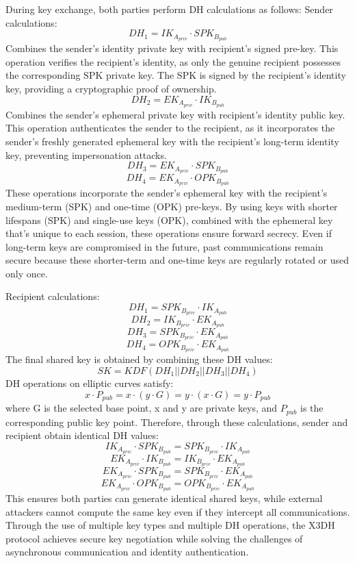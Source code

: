 \documentclass[9pt,a4paper,twoside]{rho-class/rho}
\begin{document}
During key exchange, both parties perform DH calculations as follows:
Sender calculations:
$$DH_1 = IK_{A_{priv}} \cdot SPK_{B_{pub}}$$
Combines the sender's identity private key with recipient's signed pre-key. This operation verifies the recipient's identity, as only the genuine recipient possesses the corresponding SPK private key. The SPK is signed by the recipient's identity key, providing a cryptographic proof of ownership.
$$DH_2 = EK_{A_{priv}} \cdot IK_{B_{pub}}$$
Combines the sender's ephemeral private key with recipient's identity public key. This operation authenticates the sender to the recipient, as it incorporates the sender's freshly generated ephemeral key with the recipient's long-term identity key, preventing impersonation attacks.
$$DH_3 = EK_{A_{priv}} \cdot SPK_{B_{pub}}$$
$$DH_4 = EK_{A_{priv}} \cdot OPK_{B_{pub}}$$
These operations incorporate the sender's ephemeral key with the recipient's medium-term (SPK) and one-time (OPK) pre-keys. By using keys with shorter lifespans (SPK) and single-use keys (OPK), combined with the ephemeral key that's unique to each session, these operations ensure forward secrecy. Even if long-term keys are compromised in the future, past communications remain secure because these shorter-term and one-time keys are regularly rotated or used only once.

Recipient calculations:
$$DH_1 = SPK_{B_{priv}} \cdot IK_{A_{pub}}$$
$$DH_2 = IK_{B_{priv}} \cdot EK_{A_{pub}}$$
$$DH_3 = SPK_{B_{priv}} \cdot EK_{A_{pub}}$$
$$DH_4 = OPK_{B_{priv}} \cdot EK_{A_{pub}}$$
The final shared key is obtained by combining these DH values:
$$SK = KDF(DH_1 || DH_2 || DH_3 || DH_4)$$
DH operations on elliptic curves satisfy:
$$x \cdot P_{pub} = x \cdot (y \cdot G) = y \cdot (x \cdot G) = y \cdot P_{pub}$$
where G is the selected base point, x and y are private keys, and $P_{pub}$ is the corresponding public key point. Therefore, through these calculations, sender and recipient obtain identical DH values:
$$IK_{A_{priv}} \cdot SPK_{B_{pub}} = SPK_{B_{priv}} \cdot IK_{A_{pub}}$$
$$EK_{A_{priv}} \cdot IK_{B_{pub}} = IK_{B_{priv}} \cdot EK_{A_{pub}}$$
$$EK_{A_{priv}} \cdot SPK_{B_{pub}} = SPK_{B_{priv}} \cdot EK_{A_{pub}}$$
$$EK_{A_{priv}} \cdot OPK_{B_{pub}} = OPK_{B_{priv}} \cdot EK_{A_{pub}}$$
This ensures both parties can generate identical shared keys, while external attackers cannot compute the same key even if they intercept all communications. Through the use of multiple key types and multiple DH operations, the X3DH protocol achieves secure key negotiation while solving the challenges of asynchronous communication and identity authentication.
\end{document}
